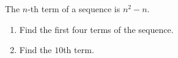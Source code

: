 The $n$-th term of a sequence is $n^2-n$.
\begin{enumerate}
\item[(a)] Find the first four terms of the sequence.
\item[(b)] Find the $10$th term.
\end{enumerate}
